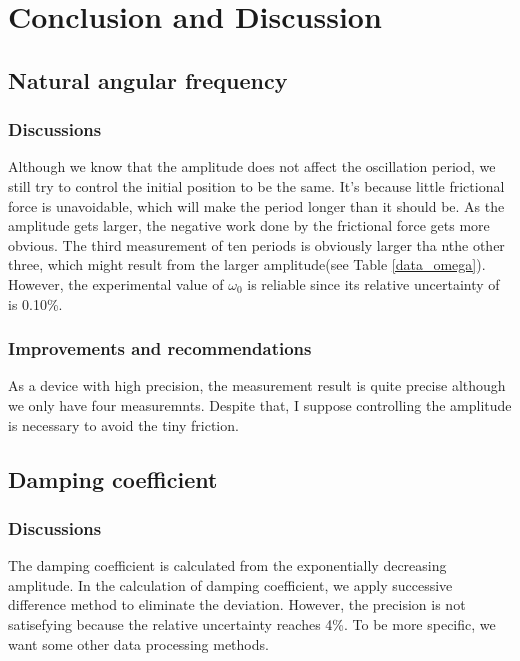 \section{Conclusion and Discussion}
\subsection{Natural angular frequency}
\subsubsection{Discussions}
    Although we know that the amplitude does not affect the oscillation period, we still try to control the initial position to be the same. It's because little frictional force is unavoidable, which will make the period longer than it should be. As the amplitude gets larger, the negative work done by the frictional force gets more obvious. The third measurement of ten periods is obviously larger tha nthe other three, which might result from the larger amplitude(see Table \ref{data_omega}). However, the experimental value of $\omega_0$ is reliable since its relative uncertainty of is 0.10\%.

\subsubsection{Improvements and recommendations}
    As a device with high precision, the measurement result is quite precise although we only have four measuremnts. Despite that, I suppose controlling the amplitude is necessary to avoid the tiny friction.

\subsection{Damping coefficient}
\subsubsection{Discussions}
    The damping coefficient is calculated from the exponentially decreasing amplitude. In the calculation of damping coefficient, we apply successive difference method to eliminate the deviation. However, the precision is not satisefying because the relative uncertainty reaches 4\%. To be more specific, we want some other data processing methods.

